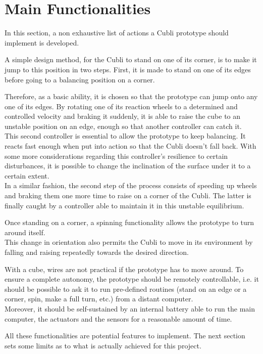 \section{Main Functionalities}\label{sec:mainFunctionalities}
In this section, a non exhaustive list of actions a Cubli prototype should implement is developed.

A simple design method, for the Cubli to stand on one of its corner, is to make it jump to this position in two steps. First, it is made to stand on one of its edges before going to a balancing position on a corner.

Therefore, as a basic ability, it is chosen so that the prototype can jump onto any one of its edges.
By rotating one of its reaction wheels to a determined and controlled velocity and braking it suddenly, it is able to raise the cube to an unstable position on an edge, enough so that another controller can catch it.\\
This second controller is essential to allow the prototype to keep balancing. It reacts fast enough when put into action so that the Cubli doesn't fall back. With some more considerations regarding this controller's resilience to certain disturbances, it is possible to change the inclination of the surface under it to a certain extent.\\
In a similar fashion, the second step of the process consists of speeding up wheels and braking them one more time to raise on a corner of the Cubli. The latter is finally caught by a controller able to maintain it in this unstable equilibrium.

Once standing on a corner, a spinning functionality allows the prototype to turn around itself.\\
This change in orientation also permits the Cubli to move in its environment by falling and raising repeatedly towards the desired direction.

With a cube, wires are not practical if the prototype has to move around. To ensure a complete autonomy, the prototype should be remotely controllable, i.e. it should be possible to ask it to run pre-defined routines (stand on an edge or a corner, spin, make a full turn, etc.) from a distant computer.\\
Moreover, it should be self-sustained by an internal battery able to run the main computer, the actuators and the sensors for a reasonable amount of time.

All these functionalities are potential features to implement. The next section sets some limits as to what is actually achieved for this project.